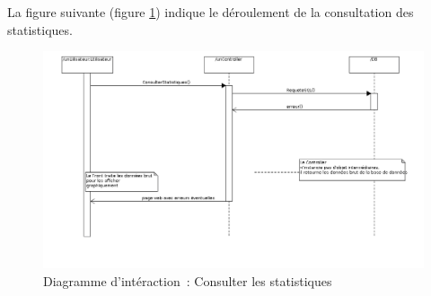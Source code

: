 La figure suivante (figure \ref{diagrammeInteraction4}) indique le déroulement de la consultation des statistiques. 
\begin{figure}[H]
	\centering
	\includegraphics[scale=0.35]{images/diagrammesInteraction/04_diagrammeInteractionF11.png}
	\caption{Diagramme d'intéraction~: Consulter les statistiques}
	\label{diagrammeInteraction4}
\end{figure}
